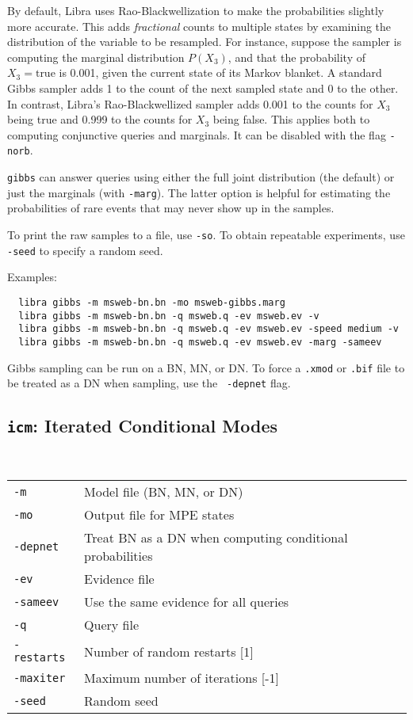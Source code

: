\documentclass[11pt]{article}
\begin{document}
By default, Libra uses Rao-Blackwellization to make the probabilities
slightly more accurate.  This adds {\em fractional} counts to multiple
states by examining the distribution of the variable to be resampled.
For instance, suppose the sampler is computing the marginal
distribution $P(X_3)$, and that the probability of $X_3 = \text{true}$
is 0.001, given the current state of its Markov blanket.  A standard
Gibbs sampler adds 1 to the count of the next sampled state and 0 to
the other.  In contrast, Libra's Rao-Blackwellized sampler adds 0.001
to the counts for $X_3$ being true and 0.999 to the counts for $X_3$
being false.  This applies both to computing conjunctive queries and
marginals.  It can be disabled with the flag {\tt -norb}.

{\tt gibbs} can answer queries using either the full joint
distribution (the default) or just the marginals (with {\tt -marg}).
The latter option is helpful for estimating the probabilities of rare
events that may never show up in the samples.

To print the raw samples to a file, use {\tt -so}.  To obtain
repeatable experiments, use {\tt -seed} to specify a random seed.

Examples:
\begin{verbatim}
  libra gibbs -m msweb-bn.bn -mo msweb-gibbs.marg
  libra gibbs -m msweb-bn.bn -q msweb.q -ev msweb.ev -v
  libra gibbs -m msweb-bn.bn -q msweb.q -ev msweb.ev -speed medium -v
  libra gibbs -m msweb-bn.bn -q msweb.q -ev msweb.ev -marg -sameev
\end{verbatim}

Gibbs sampling can be run on a BN, MN, or DN.  To force a {\tt .xmod}
or {\tt .bif} file to be treated as a DN when sampling, use the {\tt
-depnet} flag.

\subsection{{\tt icm}: Iterated Conditional Modes} \label{sec:icm}

\noindent {} \\
\begin{tabular}{ll}
{\tt -m} &         Model file (BN, MN, or DN) \\
{\tt -mo} &        Output file for MPE states \\
{\tt -depnet} &    Treat BN as a DN when computing conditional probabilities \\
{\tt -ev} &        Evidence file \\
{\tt -sameev} &    Use the same evidence for all queries \\
{\tt -q} &         Query file \\
{\tt -restarts} &  Number of random restarts [1] \\
{\tt -maxiter} &   Maximum number of iterations [-1] \\
{\tt -seed} &      Random seed \\
\end{tabular} \\
\end{document}
